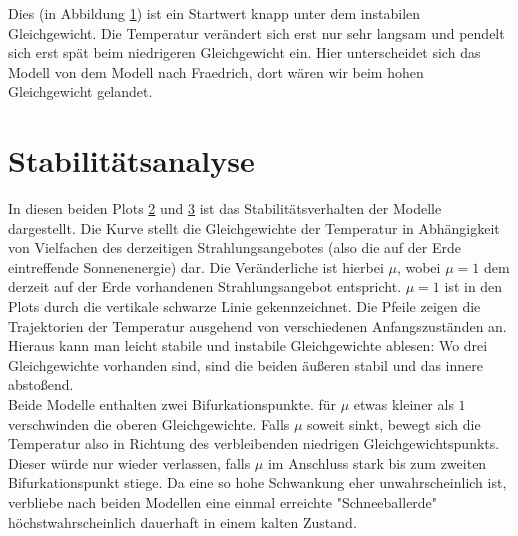 \documentclass[]{report}
\begin{document}
\begin{figure}[h!] \centering \def\svgwidth{\columnwidth} \caption{} \label{gd288}  \end{figure}

Dies (in Abbildung \ref{gd288}) ist ein Startwert knapp unter dem instabilen Gleichgewicht. Die Temperatur verändert sich erst nur sehr langsam und pendelt sich erst spät beim niedrigeren Gleichgewicht ein. Hier unterscheidet sich das Modell von dem Modell nach Fraedrich, dort wären wir beim hohen Gleichgewicht gelandet.





\section{Stabilitätsanalyse}

\begin{figure}[h!] \centering \def\svgwidth{\columnwidth}  \caption{} \label{stabfr} \end{figure}
\begin{figure}[h!] \centering \def\svgwidth{\columnwidth}  \caption{} \label{stabgd} \end{figure}

In diesen beiden Plots \ref{stabfr} und \ref{stabgd} ist das Stabilitätsverhalten der Modelle dargestellt. Die Kurve stellt die Gleichgewichte der Temperatur in Abhängigkeit von Vielfachen des derzeitigen Strahlungsangebotes (also die auf der Erde eintreffende Sonnenenergie) dar. Die Veränderliche ist hierbei $\mu$, wobei $\mu = 1$ dem derzeit auf der Erde vorhandenen Strahlungsangebot entspricht. $\mu = 1$ ist in den Plots durch die vertikale schwarze Linie gekennzeichnet. Die Pfeile zeigen die Trajektorien der Temperatur ausgehend von verschiedenen Anfangszuständen an. Hieraus kann man leicht stabile und instabile Gleichgewichte ablesen: Wo drei Gleichgewichte vorhanden sind, sind die beiden äußeren stabil und das innere abstoßend.\\
Beide Modelle enthalten zwei Bifurkationspunkte. für $\mu$ etwas kleiner als $1$ verschwinden die oberen Gleichgewichte. Falls $\mu$ soweit sinkt, bewegt sich die Temperatur also in Richtung des verbleibenden niedrigen Gleichgewichtspunkts. Dieser würde nur wieder verlassen, falls $\mu$ im Anschluss stark bis zum zweiten Bifurkationspunkt stiege. Da eine so hohe Schwankung eher unwahrscheinlich ist, verbliebe nach beiden Modellen eine einmal erreichte "Schneeballerde" höchstwahrscheinlich dauerhaft in einem kalten Zustand.
\end{document}
